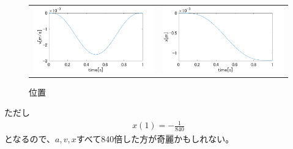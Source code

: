 \documentclass[a4paper,11pt]{jsarticle}
\begin{document}
\begin{figure}[h]
  \begin{tabular}{cc}
    \begin{minipage}[t]{0.5\textwidth}
      \centering
      \includegraphics[width = 1\textwidth]{velocity.png}
      \caption{速度}
      \label{fig:velocity}
    \end{minipage} &
    \begin{minipage}[t]{0.5\textwidth}
      \centering
      \includegraphics[width = 1\textwidth]{position.png}
      \caption{位置}
      \label{fig:position}
    \end{minipage}
  \end{tabular}
\end{figure}

ただし
\begin{align*}
  x(1) = -\frac{1}{840}
\end{align*}
となるので、$a, v, x$すべて840倍した方が奇麗かもしれない。
\end{document}
